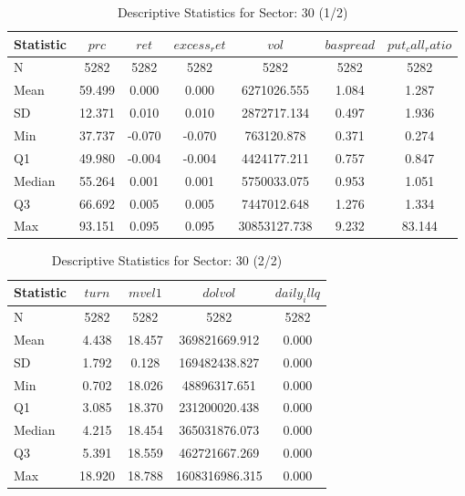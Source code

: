     \begin{table}[ht]
    \centering

    
    \caption{Descriptive Statistics for Sector: 30 (1/2)}
    \label{tab:sec30_a}
    
    \begin{tabular}{lcccccc}
    \toprule
    Statistic & $prc$ & $ret$ & $excess_ret$ & $vol$ & $baspread$ & $put_call_ratio$ \\\midrule
    N & 5282 & 5282 & 5282 & 5282 & 5282 & 5282 \\
    Mean & 59.499 & 0.000 & 0.000 & 6271026.555 & 1.084 & 1.287 \\
    SD & 12.371 & 0.010 & 0.010 & 2872717.134 & 0.497 & 1.936 \\
    Min & 37.737 & -0.070 & -0.070 & 763120.878 & 0.371 & 0.274 \\
    Q1 & 49.980 & -0.004 & -0.004 & 4424177.211 & 0.757 & 0.847 \\
    Median & 55.264 & 0.001 & 0.001 & 5750033.075 & 0.953 & 1.051 \\
    Q3 & 66.692 & 0.005 & 0.005 & 7447012.648 & 1.276 & 1.334 \\
    Max & 93.151 & 0.095 & 0.095 & 30853127.738 & 9.232 & 83.144 \\
    \bottomrule
    \end{tabular}

    \end{table}
    
    \begin{table}[ht]
    \centering

    
    \caption{Descriptive Statistics for Sector: 30 (2/2)}
    \label{tab:sec30_b}
    
    \begin{tabular}{lcccc}
    \toprule
    Statistic & $turn$ & $mvel1$ & $dolvol$ & $daily_illq$ \\\midrule
    N & 5282 & 5282 & 5282 & 5282 \\
    Mean & 4.438 & 18.457 & 369821669.912 & 0.000 \\
    SD & 1.792 & 0.128 & 169482438.827 & 0.000 \\
    Min & 0.702 & 18.026 & 48896317.651 & 0.000 \\
    Q1 & 3.085 & 18.370 & 231200020.438 & 0.000 \\
    Median & 4.215 & 18.454 & 365031876.073 & 0.000 \\
    Q3 & 5.391 & 18.559 & 462721667.269 & 0.000 \\
    Max & 18.920 & 18.788 & 1608316986.315 & 0.000 \\
    \bottomrule
    \end{tabular}

    \end{table}
    
